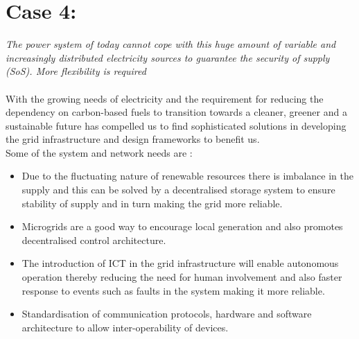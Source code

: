 \section{\textbf{Case 4:}}
\textit{The power system of today cannot cope with this huge amount of variable and increasingly distributed electricity sources to guarantee the security  of supply (SoS). More flexibility is required}\\ \\
With the growing needs of electricity and the requirement for reducing the dependency on carbon-based fuels to transition towards a cleaner, greener and a sustainable future has compelled us to find sophisticated solutions in developing the grid infrastructure and design frameworks to benefit us.
\\
Some of the system and network needs are :
    \begin{itemize}
        \item Due to the fluctuating nature of renewable resources there is imbalance in the supply and this can be solved by a decentralised storage system to ensure stability of supply and in turn making the grid more reliable. 
        \item Microgrids are a good way to encourage local generation and also promotes decentralised control architecture. 
        \item The introduction of ICT in the grid infrastructure will enable autonomous operation thereby reducing the need for human involvement and also faster response to events such as faults in the system making it more reliable. 
        \item Standardisation of communication protocols, hardware and software architecture to allow inter-operability of devices. 
    \end{itemize}

